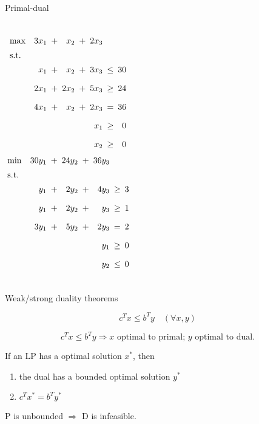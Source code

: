 \begin{frame}{Primal-dual }
  \begin{columns}
	  \begin{equation*}
		\setlength\arraycolsep{2.5pt}
		\begin{array}{l@{\quad}rcrcrcr}
		  \max 	& 3x_1  &+&	x_2		&+&	2x_3	&	&	\\[5pt]
		  \text{s.t.} 	&	&	&	&	&	&	&	\\[5pt]
				& x_1   &+&	x_2		&+&	3x_3	&\leq& 30 \\[10pt]
				& 2x_1	&+&	2x_2 	&+& 5x_3 	&\geq& 24 \\[10pt]
				& 4x_1  &+&	x_2		&+&	2x_3	&=& 36	\\[10pt]
				& &&	&&	x_1 &\geq&	0	\\[10pt]
				& &&	&&	x_2 &\geq&	0
		\end{array}
	  \end{equation*}
	  \begin{equation*}
		\setlength\arraycolsep{2.5pt}
		\begin{array}{l@{\quad}rcrcrcr}
		  \min 	& 30y_1  &+&	24y_2		&+&	36y_3	&	&	\\[5pt]
		  \text{s.t.} 	&	&	&	&	&	&	&	\\[5pt]
				& y_1   &+&	2y_2	&+&	4y_3	&\geq& 3 \\[10pt]
				& y_1	&+&	2y_2 	&+& y_3 	&\geq& 1 \\[10pt]
				& 3y_1  &+&	5y_2	&+&	2y_3	&=& 2	\\[10pt]
				& &&	&&	y_1 &\geq&	0	\\[10pt]
				& &&	&&	y_2 &\leq&	0
		\end{array}
	  \end{equation*}
  \end{columns}
\end{frame}
\begin{frame}{Weak/strong duality theorems}
  \begin{theorem}
	\[
	  c^{T} x \leq b^{T} y	\quad (\forall x, y)
	\]
  \end{theorem}

  \begin{corollary}[29.9]
	\[
	  c^{T} x \leq b^{T} y \Rightarrow x \text{ optimal to primal; } y \text{ optimal to dual.} 
	\]
  \end{corollary}

  \begin{theorem}
	If an LP has a  optimal solution $x^{\ast}$, then
	\begin{enumerate}
	  \item the dual has a bounded optimal solution $y^{\ast}$
	  \item $c^{T} x^{\ast} = b^{T} y^{\ast}$
	\end{enumerate}
  \end{theorem}

  \centerline{ P is unbounded $\Rightarrow$ D is infeasible.}
\end{frame}
